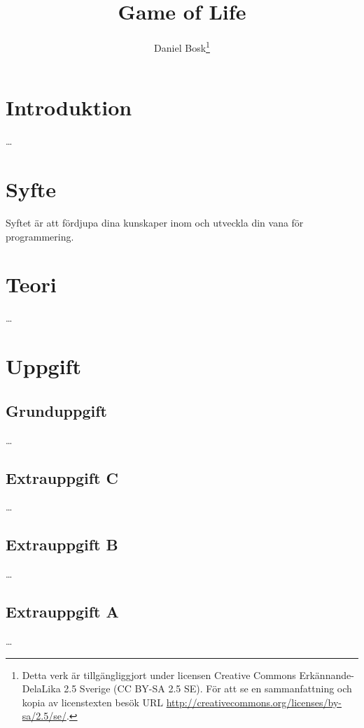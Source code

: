 \documentclass[a4paper]{miunasgn}
\title{Game of Life}
\author{Daniel Bosk\footnote{%
	Detta verk är tillgängliggjort under licensen Creative Commons 
	Erkännande-DelaLika 2.5 Sverige (CC BY-SA 2.5 SE).
	För att se en sammanfattning och kopia av licenstexten besök URL 
	\url{http://creativecommons.org/licenses/by-sa/2.5/se/}.
}}
\date{\svnId}
\theoremstyle{definition}
\begin{document}
\maketitle
\thispagestyle{foot}
\tableofcontents


\section{Introduktion}
\noindent
\dots


\section{Syfte}
\noindent
Syftet är att fördjupa dina kunskaper inom och utveckla din vana för 
programmering.


\section{Teori}
\label{sec:Theory}
\noindent
\dots


\section{Uppgift}
\label{sec:Tasks}
\noindent


\subsection{Grunduppgift}
\noindent
\dots

\subsection{Extrauppgift C}
\noindent
\dots

\subsection{Extrauppgift B}
\noindent
\dots

\subsection{Extrauppgift A}
\noindent
\dots






\end{document}
